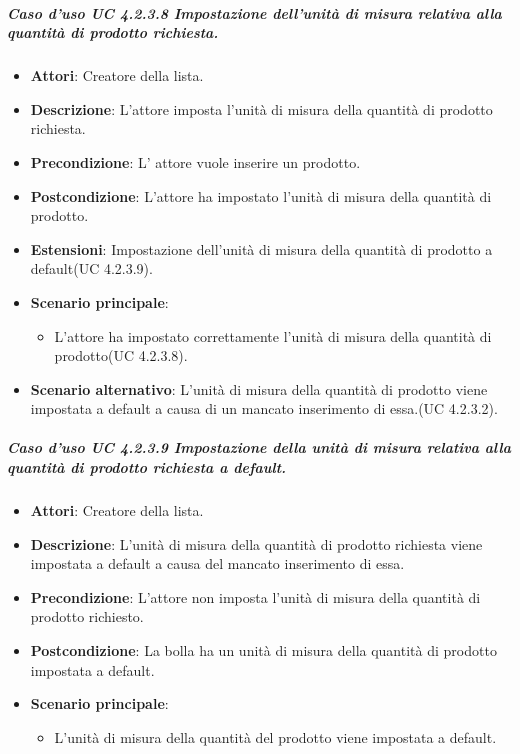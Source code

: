 	\subparagraph{Caso d'uso UC 4.2.3.8 Impostazione dell'unità di misura relativa alla quantità di prodotto richiesta.}
	\begin{itemize}
		\item\textbf{Attori}: Creatore della lista.
		\item\textbf{Descrizione}: L'attore imposta l'unità di misura della quantità di prodotto richiesta.
		\item\textbf{Precondizione}: L' attore vuole inserire un prodotto.
		\item\textbf{Postcondizione}: L'attore ha impostato l'unità di misura della quantità di prodotto.
		\item\textbf{Estensioni}: Impostazione dell'unità di misura della quantità di prodotto a default(UC 4.2.3.9).
		\item\textbf{Scenario principale}:
			\begin{itemize}
				\item L'attore ha impostato correttamente l'unità di misura della quantità di prodotto(UC 4.2.3.8). 
			\end{itemize}
		\item\textbf{Scenario alternativo}: L'unità di misura della quantità di prodotto viene impostata a default a causa di un mancato inserimento di essa.(UC 4.2.3.2).
		
	\end{itemize}
	
	
	
\subparagraph{Caso d'uso UC 4.2.3.9 Impostazione della unità di misura relativa alla quantità di prodotto richiesta a default.}
	\begin{itemize}
		\item\textbf{Attori}: Creatore della lista.
		\item\textbf{Descrizione}: L'unità di misura della quantità di prodotto richiesta viene impostata a default a causa del mancato inserimento di essa.
		\item\textbf{Precondizione}: L'attore non imposta l'unità di misura della quantità di prodotto richiesto.
		\item\textbf{Postcondizione}: La bolla ha un unità di misura della quantità di prodotto impostata a default.
		\item\textbf{Scenario principale}:
			\begin{itemize}
				\item L'unità di misura della quantità del prodotto viene impostata a default.
			\end{itemize}
		
\end{itemize}
	
